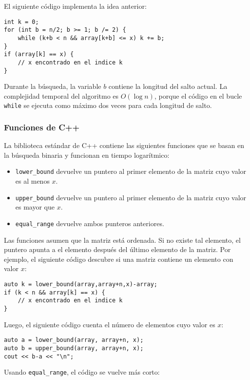 El siguiente código implementa la idea anterior:
\begin{lstlisting}
int k = 0;
for (int b = n/2; b >= 1; b /= 2) {
    while (k+b < n && array[k+b] <= x) k += b;
}
if (array[k] == x) {
    // x encontrado en el indice k
}
\end{lstlisting}

Durante la búsqueda, la variable $b$
contiene la longitud del salto actual.
La complejidad temporal del algoritmo es $O(\log n)$,
porque el código en el bucle \texttt{while}
se ejecuta como máximo dos veces para cada longitud de salto.

\subsubsection{Funciones de C++}

La biblioteca estándar de C++ contiene las siguientes funciones
que se basan en la búsqueda binaria y funcionan en tiempo logarítmico:

\begin{itemize}
\item \texttt{lower\_bound} devuelve un puntero al
primer elemento de la matriz cuyo valor es al menos $x$.
\item \texttt{upper\_bound} devuelve un puntero al
primer elemento de la matriz cuyo valor es mayor que $x$.
\item \texttt{equal\_range} devuelve ambos punteros anteriores.
\end{itemize}

Las funciones asumen que la matriz está ordenada.
Si no existe tal elemento, el puntero apunta a
el elemento después del último elemento de la matriz.
Por ejemplo, el siguiente código descubre si
una matriz contiene un elemento con valor $x$:

\begin{lstlisting}
auto k = lower_bound(array,array+n,x)-array;
if (k < n && array[k] == x) {
    // x encontrado en el indice k
}
\end{lstlisting}

Luego, el siguiente código cuenta el número de elementos
cuyo valor es $x$:

\begin{lstlisting}
auto a = lower_bound(array, array+n, x);
auto b = upper_bound(array, array+n, x);
cout << b-a << "\n";
\end{lstlisting}

Usando \texttt{equal\_range}, el código se vuelve más corto:

